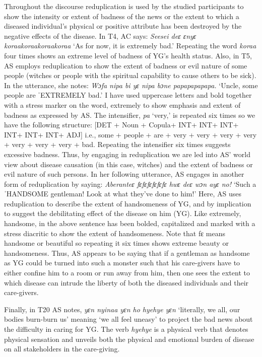 \documentclass[output=paper,colorlinks,citecolor=brown]{langscibook}
\begin{document}
Throughout the discourse reduplication is used by the studied participants to show the intensity or extent of badness of the news or the extent to which a diseased individual’s physical or positive attribute has been destroyed by the negative effects of the disease. In T4, AC says: \textit{Seesei deɛ ɛnyɛ koraakoraakoraakoraa} ‘As for now, it is extremely bad.’ Repeating the word \textit{koraa} four times shows an extreme level of badness of YG’s health status. Also, in T5, AS employs reduplication to show the extent of badness or evil nature of some people (witches or people with the spiritual capability to cause others to be sick). In the utterance, she notes: \textit{Wɔfa nipa bi yɛ nipa bɔne papapapapapa.} ‘Uncle, some people are ˈEXTREMELY bad.’ I have used uppercase letters and bold together with a stress marker on the word, extremely to show emphasis and extent of badness as expressed by AS. The intensifier, \textit{pa} ‘very,’ is repeated six times so we have the following structure: [DET + Noun + Copula+ INT+ INT+ INT+ INT+ INT+ INT+ ADJ] i.e., some + people + are + very + very + very + very + very + very + very + bad. Repeating the intensifier six times suggests excessive badness. Thus, by engaging in reduplication we are led into AS’ world view about disease causation (in this case, witches) and the extent of badness or evil nature of such persons. In her following utterance, AS engages in another form of reduplication by saying: \textit{Aberanteɛ fɛfɛfɛfɛfɛfɛ hwɛ deɛ wɔn ayɛ no!} ‘Such a ˈHANDSOME gentleman! Look at what they’ve done to him!’ Here, AS uses reduplication to describe the extent of handsomeness of YG, and by implication to suggest the debilitating effect of the disease on him (YG). Like extremely, handsome, in the above sentence has been bolded, capitalized and marked with a stress diacritic to show the extent of handsomeness. Note that fɛ means handsome or beautiful so repeating it six times shows extreme beauty or handsomeness. Thus, AS appears to be saying that if a gentleman as handsome as YG could be turned into such a monster such that his care-givers have to either confine him to a room or run away from him, then one sees the extent to which disease can intrude the liberty of both the diseased individuals and their care-givers.

Finally, in T20 AS notes, \textit{yɛn nyinaa yɛn ho hyehye yɛn} ‘literally, we all, our bodies burn-burn us’ meaning ‘we all feel uneasy’ to project the bad news about the difficulty in caring for YG. The verb \textit{hyehye} is a physical verb that denotes physical sensation and unveils both the physical and emotional burden of disease on all stakeholders in the care-giving.
\end{document}
